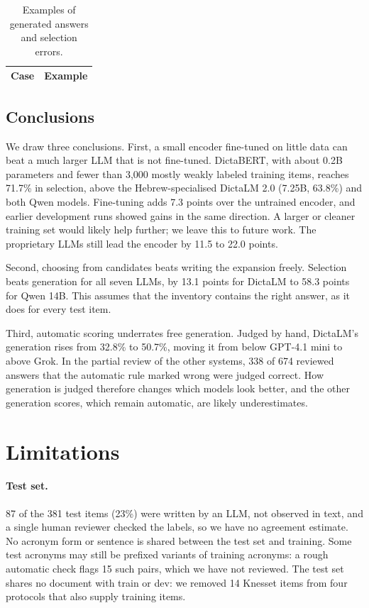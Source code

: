\documentclass[11pt]{article}
\begin{document}
\begin{table}[t]
\centering\small
\begin{tabular}{p{}p{}}
\toprule
Case & Example \\
\midrule
\bottomrule
\end{tabular}
\caption{Examples of generated answers and selection errors.}
\label{tab:res-examples}
\end{table}

\subsection{Conclusions}
\label{sec:conclusions}
We draw three conclusions. First, a small encoder fine-tuned on little data can beat a much larger LLM that is not fine-tuned. DictaBERT, with about 0.2B parameters and fewer than 3,000 mostly weakly labeled training items, reaches 71.7\% in selection, above the Hebrew-specialised DictaLM 2.0 (7.25B, 63.8\%) and both Qwen models. Fine-tuning adds 7.3 points over the untrained encoder, and earlier development runs showed gains in the same direction. A larger or cleaner training set would likely help further; we leave this to future work. The proprietary LLMs still lead the encoder by 11.5 to 22.0 points.

Second, choosing from candidates beats writing the expansion freely. Selection beats generation for all seven LLMs, by 13.1 points for DictaLM to 58.3 points for Qwen 14B. This assumes that the inventory contains the right answer, as it does for every test item.

Third, automatic scoring underrates free generation. Judged by hand, DictaLM's generation rises from 32.8\% to 50.7\%, moving it from below GPT-4.1 mini to above Grok. In the partial review of the other systems, 338 of 674 reviewed answers that the automatic rule marked wrong were judged correct. How generation is judged therefore changes which models look better, and the other generation scores, which remain automatic, are likely underestimates.


\section{Limitations}
\paragraph{Test set.} 87 of the 381 test items (23\%) were written by an LLM, not observed in text, and a single human reviewer checked the labels, so we have no agreement estimate. No acronym form or sentence is shared between the test set and training. Some test acronyms may still be prefixed variants of training acronyms: a rough automatic check flags 15 such pairs, which we have not reviewed. The test set shares no document with train or dev: we removed 14 Knesset items from four protocols that also supply training items.
\end{document}
